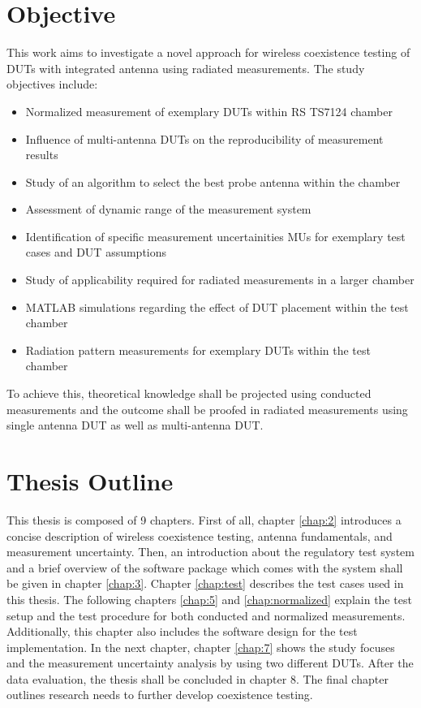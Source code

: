 \section{Objective}
This work aims to investigate a novel approach for wireless coexistence testing of \acsp{DUT} with integrated antenna using radiated measurements. The study objectives include:
\begin{itemize}
\item Normalized measurement of exemplary \acsp{DUT} within \ac{RS} TS7124 chamber
\item Influence of multi-antenna \acsp{DUT} on the reproducibility of measurement results
\item Study of an algorithm to select the best probe antenna within the chamber
\item Assessment of dynamic range of the measurement system
\item Identification of specific measurement uncertainities \acsp{MU} for exemplary test cases and \acs{DUT} assumptions
\item Study of applicability required for radiated measurements in a larger chamber
\item MATLAB simulations regarding the effect of \acs{DUT} placement within the test chamber
\item Radiation pattern measurements for exemplary \acsp{DUT} within the test chamber
\end{itemize}
To achieve this, theoretical knowledge shall be projected using conducted measurements and the outcome shall be proofed in radiated measurements using single antenna \acs{DUT} as well as multi-antenna \acs{DUT}. 

\section{Thesis Outline}
This thesis is composed of 9 chapters. First of all, chapter \ref{chap:2} introduces a concise description of wireless coexistence testing, antenna fundamentals, and measurement uncertainty. Then, an introduction about the regulatory test system and a brief overview of the software package which comes with the system shall be given in chapter \ref{chap:3}. Chapter  \ref{chap:test} describes the test cases used in this thesis. The following chapters  \ref{chap:5} and  \ref{chap:normalized} explain the test setup and the test procedure for both conducted and normalized measurements. Additionally, this chapter also includes the software design for the test implementation. In the next chapter, chapter  \ref{chap:7} shows the study focuses and the measurement uncertainty analysis by using two different \acsp{DUT}. After the data evaluation, the thesis shall be concluded in chapter 8. The final chapter outlines research needs to further develop coexistence testing.











